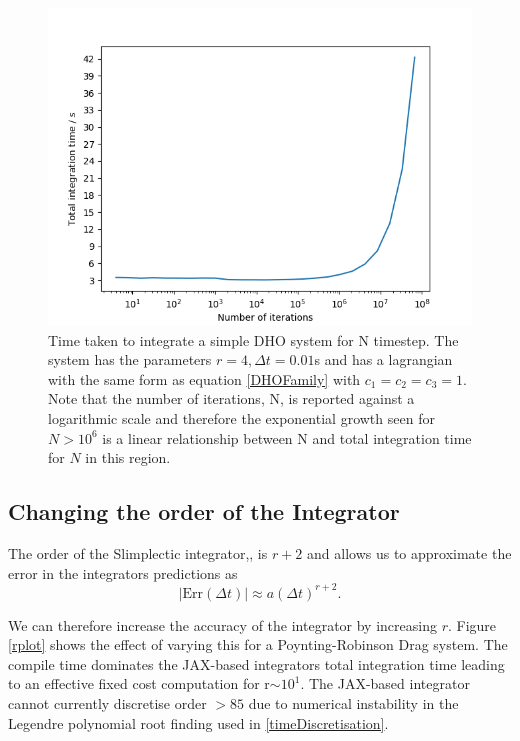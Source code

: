 \documentclass[10pt]{iopart}
\begin{document}
\begin{figure}
	\label{nplot}
	\centering
	\includegraphics[width=\columnwidth]{NPlot.jpg}
	\caption{Time taken to integrate a simple DHO system for N timestep. The system has the parameters $r=4, \Delta t=0.01$s and has a lagrangian with the same form as equation \ref{DHOFamily} with $c_1=c_2=c_3=1$. Note that the number of iterations, N, is reported against a logarithmic scale and therefore the exponential growth seen for $N>10^6$ is a linear relationship between N and total integration time for $N$ in this region.}
\end{figure}

\subsection{Changing the order of the Integrator}
The order of the Slimplectic integrator,\cite{Tsang_Slimplectic}, is $r+2$ and allows us to approximate the error in the integrators predictions as
\begin{equation}
	|\textrm{Err}(\Delta t)| \approx a(\Delta t)^{r+2}.
\end{equation}

We can therefore increase the accuracy of the integrator by increasing $r$. Figure \ref{rplot} shows the effect of varying this for a Poynting-Robinson Drag system. The compile time dominates the JAX-based integrators total integration time leading to an effective fixed cost computation for r$\sim10^1$. The JAX-based integrator cannot currently discretise order $>85$ due to numerical instability in the Legendre polynomial root finding used in \ref{timeDiscretisation}. 
\end{document}
